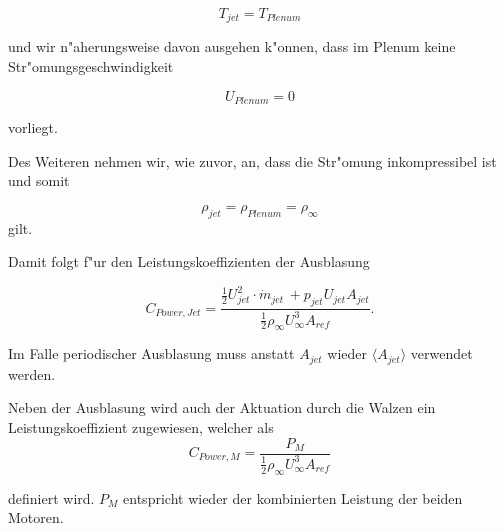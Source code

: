 	\begin{equation}
	\label{eq:T-Vereinfachung}
		T_{jet} = T_{Plenum}
	\end{equation}

und wir n"aherungsweise davon ausgehen k"onnen, dass im Plenum keine Str"omungsgeschwindigkeit 

	\begin{equation}
	\label{eq:Up}
		U_{Plenum} = 0
	\end{equation}

vorliegt.

Des Weiteren nehmen wir, wie zuvor, an, dass die Str"omung inkompressibel ist und somit

	\begin{equation}
	\label{eq:Inkompressibilitaet}
		\rho_{jet} = \rho_{Plenum} = \rho_{\infty}
	\end{equation}
gilt.

Damit folgt f"ur den Leistungskoeffizienten der Ausblasung

	\begin{equation}
	\label{eq:CPowerJ vereinfacht}
		C_{Power,Jet} = \frac{\frac{1}{2}U^2_{jet} \cdot \dot{m}_{jet} \, + p_{jet}U_{jet}A_{jet}}{\frac{1}{2}\rho_{\infty}U^3_{\infty}A_{ref}}.
	\end{equation}

Im Falle periodischer Ausblasung muss anstatt $A_{jet}$ wieder $\langle{A_{jet}}\rangle$ verwendet werden.

Neben der Ausblasung wird auch der Aktuation durch die Walzen ein Leistungskoeffizient zugewiesen, welcher als
		\begin{equation}
		\label{eq:def-CPowerM}
			C_{Power,M} = \frac{P_M}{\frac{1}{2}\rho_{\infty}U^3_{\infty}A_{ref}}
		\end{equation}
		
definiert wird.
$P_M$ entspricht wieder der kombinierten Leistung der beiden Motoren.